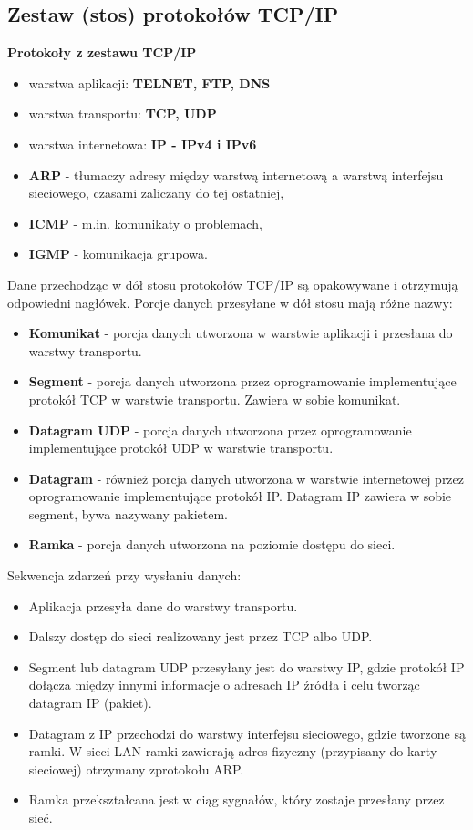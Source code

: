 \documentclass[../main.tex]{subfiles}
\begin{document}
    \subsection{Zestaw (stos) protokołów TCP/IP}

    \textbf{Protokoły z zestawu TCP/IP}
    \begin{itemize}
        \item warstwa aplikacji:  \textbf{TELNET, FTP, DNS}
        \item warstwa transportu: \textbf{TCP, UDP}
        \item warstwa internetowa: \textbf{IP - IPv4 i IPv6}
        \item \textbf{ARP} - tłumaczy adresy między warstwą internetową a warstwą interfejsu
        sieciowego, czasami zaliczany do tej ostatniej,
        \item \textbf{ICMP} - m.in. komunikaty o problemach,
        \item \textbf{IGMP} - komunikacja grupowa.

    \end{itemize}

    Dane przechodząc w dół stosu protokołów TCP/IP są opakowywane i otrzymują
    odpowiedni nagłówek. Porcje danych przesyłane w dół stosu mają różne
    nazwy:
    \begin{itemize}
        \item \textbf{Komunikat} - porcja danych utworzona w warstwie aplikacji i przesłana do warstwy transportu.
        \item \textbf{Segment} - porcja danych utworzona przez oprogramowanie implementujące protokół TCP w warstwie transportu. Zawiera w sobie komunikat.
        \item \textbf{Datagram UDP} - porcja danych utworzona przez oprogramowanie implementujące protokół UDP w warstwie transportu.
        \item \textbf{Datagram} - również porcja danych utworzona w warstwie internetowej przez oprogramowanie implementujące protokół IP. Datagram IP zawiera w sobie segment, bywa nazywany pakietem.
        \item \textbf{Ramka} - porcja danych utworzona na poziomie dostępu do sieci.
    \end{itemize}

    Sekwencja zdarzeń przy wysłaniu danych:
    \begin{itemize}
        \item Aplikacja przesyła dane do warstwy transportu.
        \item Dalszy dostęp do sieci realizowany jest przez TCP albo UDP.
        \item Segment lub datagram UDP przesyłany jest do warstwy IP, gdzie protokół IP dołącza między innymi informacje o adresach IP źródła i celu tworząc datagram IP (pakiet).
        \item Datagram z IP przechodzi do warstwy interfejsu sieciowego, gdzie tworzone są ramki. W sieci LAN ramki zawierają adres fizyczny (przypisany do karty sieciowej) otrzymany zprotokołu ARP.
        \item Ramka przekształcana jest w ciąg sygnałów, który zostaje przesłany przez sieć.
    \end{itemize}
\end{document}

